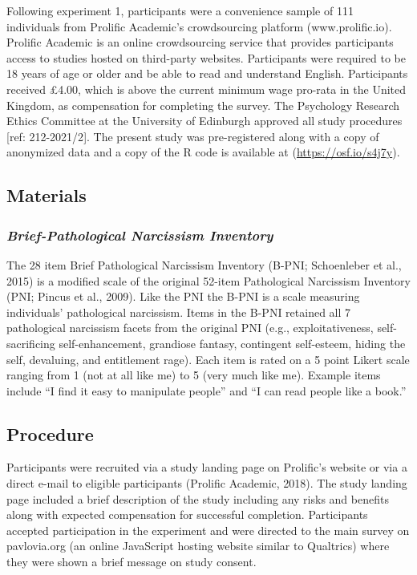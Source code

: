 \documentclass[
  donotrepeattitle,doc, 12pt, a4paper,floatsintext]{apa7}
\begin{document}
Following experiment 1, participants were a convenience sample of 111 individuals from Prolific Academic's crowdsourcing platform (www.prolific.io). Prolific Academic is an online crowdsourcing service that provides participants access to studies hosted on third-party websites. Participants were required to be 18 years of age or older and be able to read and understand English. Participants received £4.00, which is above the current minimum wage pro-rata in the United Kingdom, as compensation for completing the survey. The Psychology Research Ethics Committee at the University of Edinburgh approved all study procedures {[}ref: 212-2021/2{]}. The present study was pre-registered along with a copy of anonymized data and a copy of the R code is available at (\url{https://osf.io/s4j7y}).

\hypertarget{materials-1}{%
\subsection{Materials}\label{materials-1}}

\hypertarget{brief-pathological-narcissism-inventory}{%
\subsubsection{\texorpdfstring{\emph{Brief-Pathological Narcissism Inventory}}{Brief-Pathological Narcissism Inventory}}\label{brief-pathological-narcissism-inventory}}

The 28 item Brief Pathological Narcissism Inventory (B-PNI; Schoenleber et al., 2015) is a modified scale of the original 52-item Pathological Narcissism Inventory (PNI; Pincus et al., 2009). Like the PNI the B-PNI is a scale measuring individuals' pathological narcissism. Items in the B-PNI retained all 7 pathological narcissism facets from the original PNI (e.g., exploitativeness, self-sacrificing self-enhancement, grandiose fantasy, contingent self-esteem, hiding the self, devaluing, and entitlement rage). Each item is rated on a 5 point Likert scale ranging from 1 (not at all like me) to 5 (very much like me). Example items include ``I find it easy to manipulate people'' and ``I can read people like a book.''

\hypertarget{procedure-1}{%
\subsection{Procedure}\label{procedure-1}}

Participants were recruited via a study landing page on Prolific's website or via a direct e-mail to eligible participants (Prolific Academic, 2018). The study landing page included a brief description of the study including any risks and benefits along with expected compensation for successful completion. Participants accepted participation in the experiment and were directed to the main survey on pavlovia.org (an online JavaScript hosting website similar to Qualtrics) where they were shown a brief message on study consent.
\end{document}
